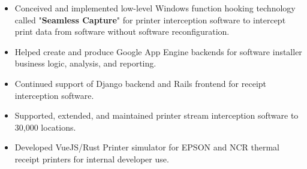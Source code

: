 \documentclass[10pt,letter,ragged2e]{altacv}
\begin{document}
\begin{paracol}{2}
\begin{itemize}
\item Conceived and implemented low-level Windows function hooking technology called "\textbf{Seamless Capture}" for printer interception software to intercept print data from software without software reconfiguration.
\item Helped create and produce Google App Engine backends for software installer business logic, analysis, and reporting.
\item Continued support of Django backend and Rails frontend for receipt interception software.
\item Supported, extended, and maintained printer stream interception software to 30,000 locations.
\item Developed VueJS/Rust Printer simulator for EPSON and NCR thermal receipt printers for internal developer use.
\end{itemize}

\divider


\end{paracol}
\end{document}
